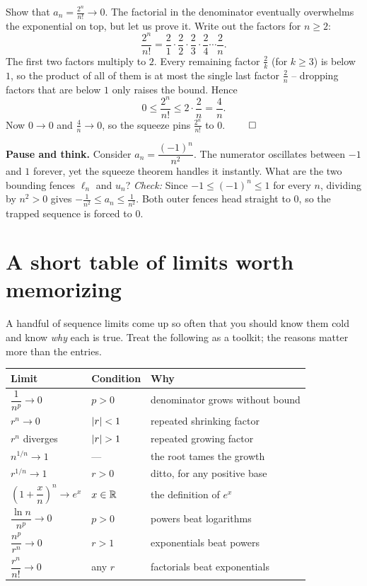 \begin{example}
\label{ch28:ex-factorial}
Show that $\displaystyle a_n = \frac{2^n}{n!} \to 0$. The factorial in the
denominator eventually overwhelms the exponential on top, but let us prove it.
Write out the factors for $n \ge 2$:
\[
  \frac{2^n}{n!}
  = \frac{2}{1}\cdot\frac{2}{2}\cdot\frac{2}{3}\cdot\frac{2}{4}\cdots\frac{2}{n}.
\]
The first two factors multiply to $2$. Every remaining factor $\tfrac{2}{k}$
(for $k \ge 3$) is below $1$, so the product of all of them is at most the single
last factor $\tfrac2n$ -- dropping factors that are below $1$ only raises the
bound. Hence
\[
  0 \le \frac{2^n}{n!} \le 2 \cdot \frac{2}{n} = \frac{4}{n}.
\]
Now $0 \to 0$ and $\tfrac4n \to 0$, so the squeeze pins $\tfrac{2^n}{n!}$ to $0$.
$\qed$
\end{example}

\begin{recoverybox}
\textbf{Pause and think.} Consider $a_n = \dfrac{(-1)^n}{n^2}$. The numerator oscillates between $-1$ and $1$ forever, yet the squeeze theorem handles it instantly. What are the two bounding fences $\ell_n$ and $u_n$?
\emph{Check:} Since $-1 \le (-1)^n \le 1$ for every $n$, dividing by $n^2 > 0$ gives $-\frac{1}{n^2} \le a_n \le \frac{1}{n^2}$. Both outer fences head straight to $0$, so the trapped sequence is forced to $0$.
\end{recoverybox}

\section{A short table of limits worth memorizing}
\label{ch28:key-limits}

A handful of sequence limits come up so often that you should know them cold and
know \emph{why} each is true. Treat the following as a toolkit; the reasons matter
more than the entries.

\begin{center}
\renewcommand{\arraystretch}{1.5}
\begin{tabular}{@{}lll@{}}
\toprule
\textbf{Limit} & \textbf{Condition} & \textbf{Why} \\
\midrule
$\dfrac1{n^p} \to 0$ & $p > 0$ & denominator grows without bound \\
$r^n \to 0$ & $\lvert r\rvert < 1$ & repeated shrinking factor \\
$r^n$ diverges & $\lvert r\rvert > 1$ & repeated growing factor \\
$n^{1/n} \to 1$ & --- & the root tames the growth \\
$r^{1/n} \to 1$ & $r > 0$ & ditto, for any positive base \\
$\left(1 + \dfrac{x}{n}\right)^{\!n} \to e^x$ & $x \in \mathbb{R}$ & the definition of $e^x$ \\
$\dfrac{\ln n}{n^p} \to 0$ & $p > 0$ & powers beat logarithms \\
$\dfrac{n^p}{r^n} \to 0$ & $r > 1$ & exponentials beat powers \\
$\dfrac{r^n}{n!} \to 0$ & any $r$ & factorials beat exponentials \\
\bottomrule
\end{tabular}
\end{center}

